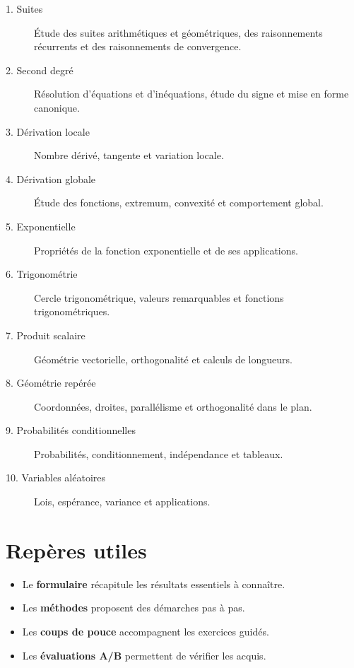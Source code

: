 \begin{description}
  \item[1. Suites] Étude des suites arithmétiques et géométriques, des
  raisonnements récurrents et des raisonnements de convergence.
  \item[2. Second degré] Résolution d'équations et d'inéquations, étude du
  signe et mise en forme canonique.
  \item[3. Dérivation locale] Nombre dérivé, tangente et variation locale.
  \item[4. Dérivation globale] Étude des fonctions, extremum, convexité et
  comportement global.
  \item[5. Exponentielle] Propriétés de la fonction exponentielle et de ses
  applications.
  \item[6. Trigonométrie] Cercle trigonométrique, valeurs remarquables et
  fonctions trigonométriques.
  \item[7. Produit scalaire] Géométrie vectorielle, orthogonalité et
  calculs de longueurs.
  \item[8. Géométrie repérée] Coordonnées, droites, parallélisme et
  orthogonalité dans le plan.
  \item[9. Probabilités conditionnelles] Probabilités, conditionnement,
  indépendance et tableaux.
  \item[10. Variables aléatoires] Lois, espérance, variance et applications.
\end{description}

\section*{Repères utiles}

\begin{itemize}
  \item Le \textbf{formulaire} récapitule les résultats essentiels à connaître.
  \item Les \textbf{méthodes} proposent des démarches pas à pas.
  \item Les \textbf{coups de pouce} accompagnent les exercices guidés.
  \item Les \textbf{évaluations A/B} permettent de vérifier les acquis.
\end{itemize}


\newpage
